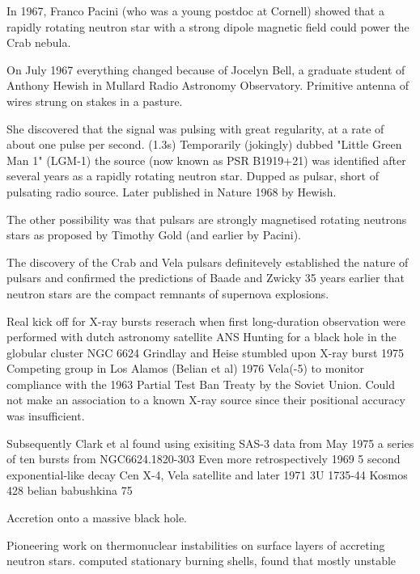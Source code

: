 In 1967, Franco Pacini (who was a young postdoc at Cornell) showed that a rapidly rotating neutron star with a strong dipole magnetic field could power the Crab nebula.


On July 1967 everything changed because of Jocelyn Bell, a graduate student of Anthony Hewish in Mullard Radio Astronomy Observatory.
Primitive antenna of wires strung on stakes in a pasture.

She discovered that the signal was pulsing with great regularity, at a rate of about one pulse per second. (1.3s)
Temporarily (jokingly) dubbed "Little Green Man 1" (LGM-1) the source (now known as PSR B1919+21) was identified after several years as a rapidly rotating neutron star.
Dupped as pulsar, short of pulsating radio source.
Later published in Nature 1968 by Hewish. \cite{Hewish68}


The other possibility was that pulsars are strongly magnetised rotating neutrons stars as proposed by Timothy Gold (and earlier by Pacini).
\cite{Gold68}

The discovery of the Crab and Vela pulsars definitevely established the nature of pulsars and confirmed the predictions of Baade and Zwicky 35 years earlier that neutron stars are the compact remnants of supernova explosions.


Real kick off for X-ray bursts reserach when first long-duration observation were performed with dutch astronomy satellite ANS
Hunting for a black hole in the globular cluster NGC 6624 Grindlay and Heise stumbled upon X-ray burst 1975 \cite{GH75} \cite{GGS76}
Competing group in Los Alamos (Belian et al) 1976\cite{BCE76}
Vela(-5) to monitor compliance with the 1963 Partial Test Ban Treaty by the Soviet Union. Could not make an association to a known X-ray source since their positional accuracy was insufficient.


Subsequently Clark et al found using exisiting SAS-3 data from May 1975 a series of ten bursts from NGC6624.1820-303 \cite{CJB76}
Even more retrospectively
1969 \cite{BCE72} 5 second exponential-like decay Cen X-4, Vela satellite  and later 1971 \cite{BKM75} 3U 1735-44 Kosmos 428  
belian \cite{BCE72}
babushkina 75\cite{BKM75}

Accretion onto a massive black hole.


Pioneering work on thermonuclear instabilities on surface layers of accreting neutron stars. \cite{HvH75}
computed stationary burning shells, found that mostly unstable

